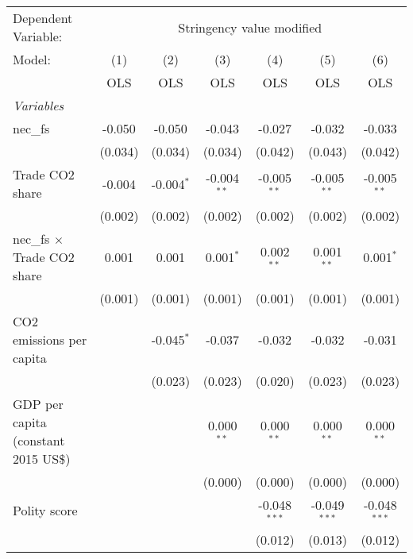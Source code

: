 
\begingroup
\centering
\begin{tabular}{lcccccc}
   \toprule
   Dependent Variable: & \multicolumn{6}{c}{Stringency value modified}\\
   Model:                               & (1)     & (2)          & (3)           & (4)            & (5)            & (6)\\  
                                        &  OLS    & OLS          & OLS           & OLS            & OLS            & OLS\\  
   \midrule
   \emph{Variables}\\
   nec\_fs                              & -0.050  & -0.050       & -0.043        & -0.027         & -0.032         & -0.033\\   
                                        & (0.034) & (0.034)      & (0.034)       & (0.042)        & (0.043)        & (0.042)\\   
   Trade CO2 share                      & -0.004  & -0.004$^{*}$ & -0.004$^{**}$ & -0.005$^{**}$  & -0.005$^{**}$  & -0.005$^{**}$\\   
                                        & (0.002) & (0.002)      & (0.002)       & (0.002)        & (0.002)        & (0.002)\\   
   nec\_fs $\times$ Trade CO2 share     & 0.001   & 0.001        & 0.001$^{*}$   & 0.002$^{**}$   & 0.001$^{**}$   & 0.001$^{*}$\\   
                                        & (0.001) & (0.001)      & (0.001)       & (0.001)        & (0.001)        & (0.001)\\   
   CO2 emissions per capita             &         & -0.045$^{*}$ & -0.037        & -0.032         & -0.032         & -0.031\\   
                                        &         & (0.023)      & (0.023)       & (0.020)        & (0.023)        & (0.023)\\   
   GDP per capita (constant 2015 US\$)  &         &              & 0.000$^{**}$  & 0.000$^{**}$   & 0.000$^{**}$   & 0.000$^{**}$\\   
                                        &         &              & (0.000)       & (0.000)        & (0.000)        & (0.000)\\   
   Polity score                         &         &              &               & -0.048$^{***}$ & -0.049$^{***}$ & -0.048$^{***}$\\   
                                        &         &              &               & (0.012)        & (0.013)        & (0.012)\\   

\end{tabular}
